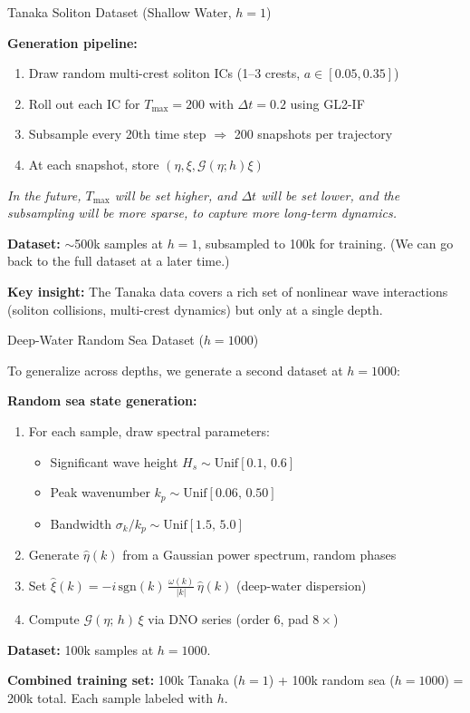 \documentclass[aspectratio=169,11pt]{beamer}
\newcommand{\Gop}{\mathcal{G}}
\begin{document}
\begin{frame}{Tanaka Soliton Dataset (Shallow Water, $h = 1$)}

\textbf{Generation pipeline:}
\begin{enumerate}
  \item Draw random multi-crest soliton ICs (1--3 crests, $a \in [0.05, 0.35]$)
  \item Roll out each IC for $T_{\max} = 200$ with $\Delta t = 0.2$ using GL2-IF
  \item Subsample every 20th time step $\Rightarrow$ 200 snapshots per trajectory
  \item At each snapshot, store $(\eta, \xi, \Gop(\eta;h)\xi)$
\end{enumerate}
\pause
\emph{In the future, $T_\text{max}$ will be set higher, and $\Delta t$ will be set lower, and the subsampling will be more sparse, to capture more long-term dynamics.}

\pause

\textbf{Dataset:} $\sim$500k samples at $h = 1$, subsampled to 100k for training.
(We can go back to the full dataset at a later time.)
\pause

\textbf{Key insight:} The Tanaka data covers a rich set of nonlinear wave interactions (soliton collisions, multi-crest dynamics) but only at a single depth.
\end{frame}

\begin{frame}{Deep-Water Random Sea Dataset ($h = 1000$)}

To generalize across depths, we generate a second dataset at $h = 1000$:

\pause

\textbf{Random sea state generation:}
\begin{enumerate}
  \item For each sample, draw spectral parameters:
    \begin{itemize}
      \item Significant wave height $H_s \sim \mathrm{Unif}[0.1,\, 0.6]$
      \item Peak wavenumber $k_p \sim \mathrm{Unif}[0.06,\, 0.50]$
      \item Bandwidth $\sigma_k/k_p \sim \mathrm{Unif}[1.5,\, 5.0]$
    \end{itemize}
  \item Generate $\hat\eta(k)$ from a Gaussian power spectrum, random phases
  \item Set $\hat\xi(k) = -i\,\mathrm{sgn}(k)\,\frac{\omega(k)}{|k|}\,\hat\eta(k)$ (deep-water dispersion)
  \item Compute $\Gop(\eta;\,h)\,\xi$ via DNO series (order 6, pad $8\times$)
\end{enumerate}

\pause

\textbf{Dataset:} 100k samples at $h = 1000$.

\textbf{Combined training set:} 100k Tanaka ($h = 1$) + 100k random sea ($h = 1000$) = 200k total.
Each sample labeled with $h$.
\end{frame}
\end{document}
